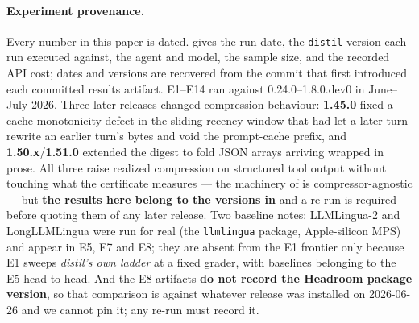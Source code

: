 \documentclass{article}
\begin{document}
\paragraph{Experiment provenance.} Every number in this paper is dated.
 gives the run date, the \texttt{distil} version each run executed
against, the agent and model, the sample size, and the recorded API cost; dates and versions
are recovered from the commit that first introduced each committed results artifact.
E1--E14 ran against 0.24.0--1.8.0.dev0 in June--July 2026. Three later releases changed
compression behaviour: \textbf{1.45.0} fixed a cache-monotonicity defect in the sliding
recency window that had let a later turn rewrite an earlier turn's bytes and void the
prompt-cache prefix, and \textbf{1.50.x}/\textbf{1.51.0} extended the digest to fold JSON
arrays arriving wrapped in prose. All three raise realized compression on structured tool
output without touching what the certificate measures --- the machinery of 
is compressor-agnostic --- but \textbf{the results here belong to the versions in
} and a re-run is required before quoting them of any later release.
Two baseline notes: LLMLingua-2 and LongLLMLingua were run for real (the \texttt{llmlingua}
package, Apple-silicon MPS) and appear in E5, E7 and E8; they are absent from the E1
frontier only because E1 sweeps \emph{distil's own ladder} at a fixed grader, with baselines
belonging to the E5 head-to-head. And the E8 artifacts \textbf{do not record the Headroom
package version}, so that comparison is against whatever release was installed on
2026-06-26 and we cannot pin it; any re-run must record it.
\end{document}
